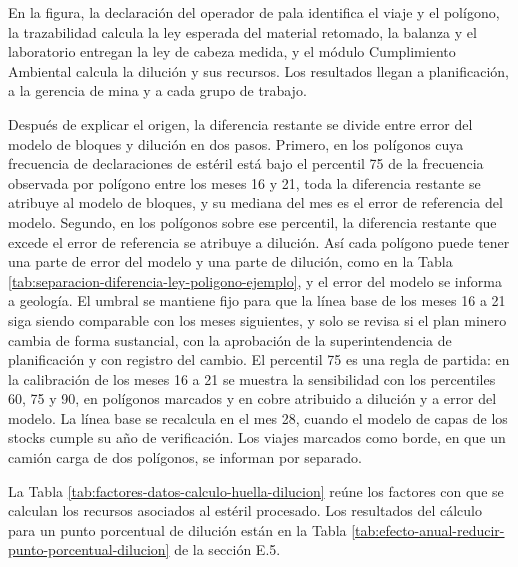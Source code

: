 \documentclass[anexo]{../../comun/overfore}
\begin{document}
En la figura, la declaración del operador de pala identifica el viaje y el polígono, la trazabilidad calcula la ley esperada del material retomado, la balanza y el laboratorio entregan la ley de cabeza medida, y el módulo Cumplimiento Ambiental calcula la dilución y sus recursos. Los resultados llegan a planificación, a la gerencia de mina y a cada grupo de trabajo.

Después de explicar el origen, la diferencia restante se divide entre error del modelo de bloques y dilución en dos pasos. Primero, en los polígonos cuya frecuencia de declaraciones de estéril está bajo el percentil 75 de la frecuencia observada por polígono entre los meses 16 y 21, toda la diferencia restante se atribuye al modelo de bloques, y su mediana del mes es el error de referencia del modelo. Segundo, en los polígonos sobre ese percentil, la diferencia restante que excede el error de referencia se atribuye a dilución. Así cada polígono puede tener una parte de error del modelo y una parte de dilución, como en la Tabla \ref{tab:separacion-diferencia-ley-poligono-ejemplo}, y el error del modelo se informa a geología. El umbral se mantiene fijo para que la línea base de los meses 16 a 21 siga siendo comparable con los meses siguientes, y solo se revisa si el plan minero cambia de forma sustancial, con la aprobación de la superintendencia de planificación y con registro del cambio. El percentil 75 es una regla de partida: en la calibración de los meses 16 a 21 se muestra la sensibilidad con los percentiles 60, 75 y 90, en polígonos marcados y en cobre atribuido a dilución y a error del modelo. La línea base se recalcula en el mes 28, cuando el modelo de capas de los stocks cumple su año de verificación. Los viajes marcados como borde, en que un camión carga de dos polígonos, se informan por separado.

La Tabla \ref{tab:factores-datos-calculo-huella-dilucion} reúne los factores con que se calculan los recursos asociados al estéril procesado. Los resultados del cálculo para un punto porcentual de dilución están en la Tabla \ref{tab:efecto-anual-reducir-punto-porcentual-dilucion} de la sección E.5.
\end{document}
